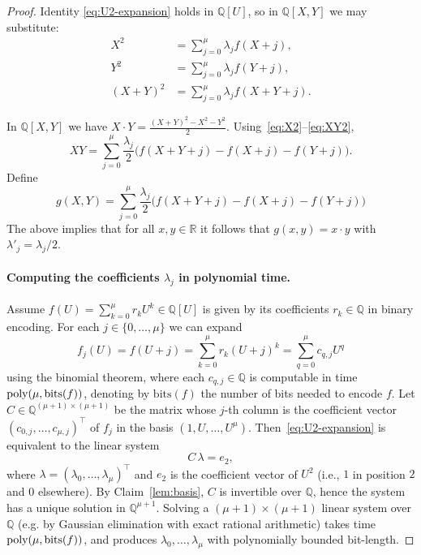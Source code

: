 \documentclass{article}
\newcommand{\Q}{\mathbb{Q}}
\newcommand{\poly}{\textnormal{poly}}
\theoremstyle{plain}
\theoremstyle{definition}
\theoremstyle{remark}
\begin{document}
\begin{proof}
	Identity \eqref{eq:U2-expansion} holds in $\mathbb{Q}[U]$, so in
	$\mathbb{Q}[X,Y]$ we may substitute:
	\begin{align}
		X^2       &= \sum_{j=0}^{\mu} \lambda_j f(X+j), \label{eq:X2} \\
		Y^2       &= \sum_{j=0}^{\mu} \lambda_j f(Y+j), \label{eq:Y2} \\
		(X+Y)^2   &= \sum_{j=0}^{\mu} \lambda_j f(X+Y+j). \label{eq:XY2}
	\end{align}
	
	In $\mathbb{Q}[X,Y]$ we have
	$
	X \cdot Y = \frac{(X+Y)^2 - X^2 - Y^2}{2}.
	$
	Using~\eqref{eq:X2}–\eqref{eq:XY2},
	\begin{equation}
		XY = \sum_{j=0}^{\mu} \frac{\lambda_j}{2}\bigl(f(X+Y+j) - f(X+j) - f(Y+j)\bigr).
	\end{equation}
Define \[g(X,Y) = \sum_{j=0}^{\mu} \frac{\lambda_j}{2}\bigl(f(X+Y+j) - f(X+j) - f(Y+j)\bigr)\]
The above implies that
 for all $x,y \in \mathbb{R}$ it follows that $g(x,y) = x \cdot y$ with $\lambda'_j = \lambda_j / 2$.

 \paragraph{Computing the coefficients $\lambda_j$ in polynomial time.}
Assume $f(U)=\sum_{k=0}^{\mu} r_k U^k\in\Q[U]$ is given by its coefficients
$r_k\in\Q$ in binary encoding. For each $j\in\{0,\ldots,{\mu}\}$ we can expand
\[
f_j(U)=f(U+j)=\sum_{k=0}^{\mu} r_k (U+j)^k=\sum_{q=0}^{\mu} c_{q,j} U^q
\]
using the binomial theorem, where each $c_{q,j}\in\Q$ is computable in time
$\poly({\mu},\mathrm{bits}(f))$, denoting by $\mathrm{bits}(f)$ the number of bits needed to encode $f$. Let $C\in\Q^{({\mu}+1)\times({\mu}+1)}$ be the matrix whose
$j$-th column is the coefficient vector $(c_{0,j},\ldots,c_{{\mu},j})^{\top}$ of
$f_j$ in the basis $(1,U,\ldots,U^{\mu})$. Then~\eqref{eq:U2-expansion} is
equivalent to the linear system
\[
C\,\lambda = e_2,
\]
where $\lambda=(\lambda_0,\ldots,\lambda_{\mu})^{\top}$ and $e_2$ is the coefficient
vector of $U^2$ (i.e., $1$ in position $2$ and $0$ elsewhere). By
Claim~\ref{lem:basis}, $C$ is invertible over $\Q$, hence the system has a unique
solution in $\Q^{{\mu}+1}$. Solving a $(\mu{+}1)\times({\mu}{+}1)$ linear system over
$\Q$ (e.g. by Gaussian elimination with exact rational arithmetic) takes time
$\poly({\mu},\mathrm{bits}(f))$, and produces $\lambda_0,\ldots,\lambda_{\mu}$ with
polynomially bounded bit-length.
\end{proof}
\end{document}
